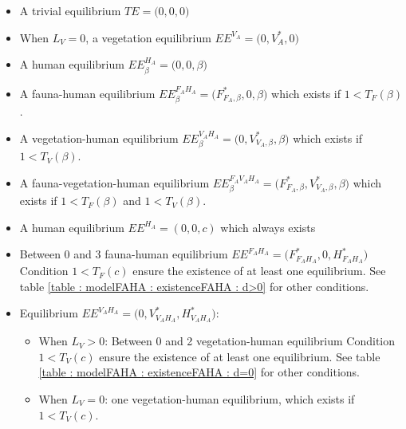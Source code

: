 \documentclass{article}
\begin{document}
\begin{itemize}
\item A trivial equilibrium $TE = \Big(0,0,0\Big)$
\item When $L_V = 0$, a vegetation equilibrium $EE^{V_A} = \Big(0,V_A^*,0\Big)$
\item A human equilibrium $EE^{H_A}_\beta = \Big(0,0,\beta\Big)$
\item A fauna-human equilibrium $EE^{F_AH_A}_\beta = \Big(F^*_{F_A, \beta}, 0, \beta\Big)$ which exists if $1 < T_F(\beta)$.
%

\item A vegetation-human equilibrium $EE^{V_AH_A}_\beta = \Big(0, V^*_{V_A, \beta}, \beta\Big)$ which exists if $1 < T_V(\beta)$.
%

\item A fauna-vegetation-human equilibrium $EE^{F_AV_AH_A}_\beta = \Big(F^*_{F_A, \beta}, V^*_{V_A, \beta}, \beta\Big)$ which exists if $1 < T_F(\beta)$ and $1 < T_V(\beta)$.

\item A human equilibrium $EE^{H_A} = (0, 0, c)$ which always exists

\item Between 0 and 3 fauna-human equilibrium
$EE^{F_AH_A} = \Big(F^*_{F_AH_A}, 0, H^*_{F_AH_A}\Big)$
Condition $1 < T_F(c)$ ensure the existence of at least one equilibrium. See table \ref{table : modelFAHA : existenceFAHA : d>0} for other conditions.

\item Equilibrium $EE^{V_AH_A} = \Big(0, V^*_{V_AH_A}, H^*_{V_AH_A}\Big)$:

\begin{itemize}
\item When $L_V > 0$: Between 0 and 2 vegetation-human equilibrium
 Condition $1 < T_V(c)$ ensure the existence of at least one equilibrium. See table \ref{table : modelFAHA : existenceFAHA : d=0} for other conditions.
 \item When $L_V = 0$: one vegetation-human equilibrium, which exists if $1 < T_V(c)$.
\end{itemize}


\end{itemize}
\end{document}
